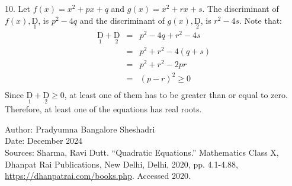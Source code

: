 \documentclass[addpoints, 12pt]{exam}
\theoremstyle{remark}
\begin{document}
10. Let $f(x) = x^2 + px + q$ and $g(x)=x^2+rx+s$. The discriminant of $f(x), \underset{\text{1}}{\text{D}}$, is $p^2-4q$ and the discriminant of $g(x), \underset{\text{2}}{\text{D}}$, is $r^2-4s$. Note that:
\begin{eqnarray*}
    \underset{\text{1}}{\text{D}} + \underset{\text{2}}{\text{D}} & = & p^2 - 4q + r^2 - 4s \\
    & = & p^2 + r^2 - 4(q+s) \\
    & = & p^2 + r^2 - 2pr \\
    & = & (p-r)^2 \geq 0 \\
\end{eqnarray*}
Since $\underset{\text{1}}{\text{D}} + \underset{\text{2}}{\text{D}} \geq 0$, at least one of them has to be greater than or equal to zero. Therefore, at least one of the equations has real roots.


\vfill
\noindent\tiny
Author: Pradyumna Bangalore Sheshadri \\
Date: December 2024 \\
Sources: Sharma, Ravi Dutt. “Quadratic Equations.” Mathematics Class X, Dhanpat Rai Publications, New Delhi, Delhi, 2020, pp. 4.1-4.88, \url{https://dhanpatrai.com/books.php}. Accessed 2020.
\end{document}
